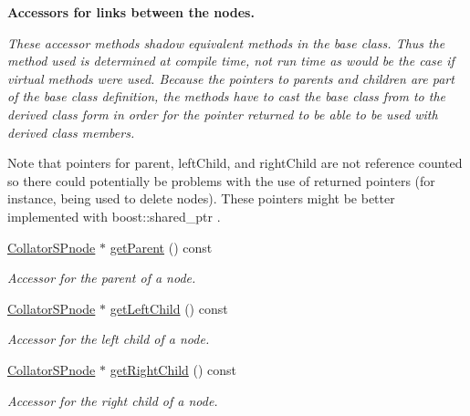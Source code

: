 \begin{Indent}{\bf \-Accessors for links between the nodes.}\par
{\em \-These accessor methods shadow equivalent methods in the base class. \-Thus the method used is determined at compile time, not run time as would be the case if virtual methods were used. \-Because the pointers to parents and children are part of the base class definition, the methods have to cast the base class from to the derived class form in order for the pointer returned to be able to be used with derived class members.

\-Note that pointers for parent, left\-Child, and right\-Child are not reference counted so there could potentially be problems with the use of returned pointers (for instance, being used to delete nodes). \-These pointers might be better implemented with boost\-::shared\-\_\-ptr . }\begin{DoxyCompactItemize}
\item 
\hyperlink{classsubpavings_1_1CollatorSPnode}{\-Collator\-S\-Pnode} $\ast$ \hyperlink{classsubpavings_1_1CollatorSPnode_aed3cb2aceae3c384eed427a404a6c8f6}{get\-Parent} () const 
\begin{DoxyCompactList}\small\item\em \-Accessor for the parent of a node. \end{DoxyCompactList}\item 
\hyperlink{classsubpavings_1_1CollatorSPnode}{\-Collator\-S\-Pnode} $\ast$ \hyperlink{classsubpavings_1_1CollatorSPnode_a5e1b32d7fffa9cfc7865b384c2e89a82}{get\-Left\-Child} () const 
\begin{DoxyCompactList}\small\item\em \-Accessor for the left child of a node. \end{DoxyCompactList}\item 
\hyperlink{classsubpavings_1_1CollatorSPnode}{\-Collator\-S\-Pnode} $\ast$ \hyperlink{classsubpavings_1_1CollatorSPnode_ab93823657d610d99e885317c2cf2e8f6}{get\-Right\-Child} () const 
\begin{DoxyCompactList}\small\item\em \-Accessor for the right child of a node. \end{DoxyCompactList}\end{DoxyCompactItemize}
\end{Indent}
